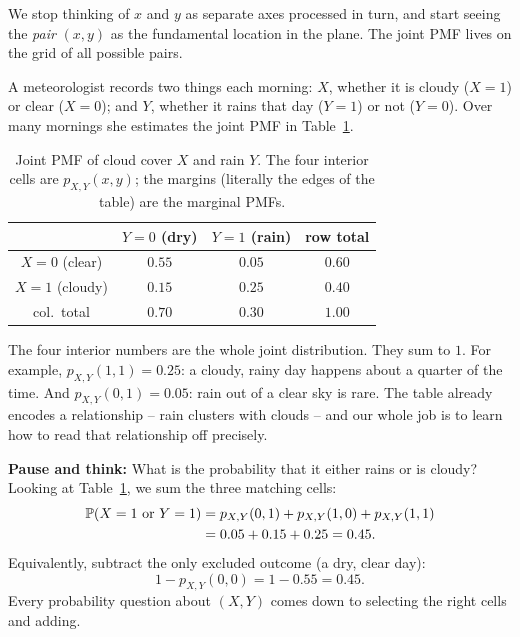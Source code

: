 We stop thinking of $x$ and $y$ as separate axes processed in turn, and start seeing the \emph{pair} $(x,y)$ as the fundamental location in the plane. The joint PMF lives on the grid of all
possible pairs.

\begin{example}
\label{ch13:ex-weather}
A meteorologist records two things each morning: $X$, whether it is cloudy
($X=1$) or clear ($X=0$); and $Y$, whether it rains that day ($Y=1$) or not
($Y=0$). Over many mornings she estimates the joint PMF in
Table~\ref{ch13:tab-weather}.

\begin{table}[H]
\centering
\begin{tabular}{c|cc|c}
 & $Y=0$ (dry) & $Y=1$ (rain) & row total \\
\hline
$X=0$ (clear)  & $0.55$ & $0.05$ & $0.60$ \\
$X=1$ (cloudy) & $0.15$ & $0.25$ & $0.40$ \\
\hline
col.\ total    & $0.70$ & $0.30$ & $1.00$ \\
\end{tabular}
\caption{Joint PMF of cloud cover $X$ and rain $Y$. The four interior cells are
$p_{X,Y}(x,y)$; the margins (literally the edges of the table) are the marginal
PMFs.}
\label{ch13:tab-weather}
\end{table}

The four interior numbers are the whole joint distribution. They sum to $1$.
For example, $p_{X,Y}(1,1)=0.25$: a cloudy, rainy day happens about a quarter of the
time. And $p_{X,Y}(0,1)=0.05$: rain out of a clear sky is rare. The table
already encodes a relationship -- rain clusters with clouds -- and our whole job
is to learn how to read that relationship off precisely.

\begin{recoverybox}
\textbf{Pause and think:} What is the probability that it either rains or is cloudy?
Looking at Table~\ref{ch13:tab-weather}, we sum the three matching cells:
\begin{align*}
  \P(X=1 \text{ or } Y=1) &= p_{X,Y}(0,1) + p_{X,Y}(1,0) + p_{X,Y}(1,1) \\
  &= 0.05 + 0.15 + 0.25 = 0.45.
\end{align*}
Equivalently, subtract the only excluded outcome (a dry, clear day):
\[
  1 - p_{X,Y}(0,0) = 1 - 0.55 = 0.45.
\] Every probability question about $(X,Y)$
comes down to selecting the right cells and adding.
\end{recoverybox}
\end{example}


